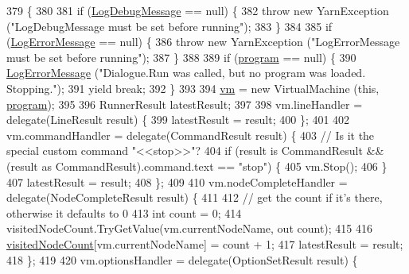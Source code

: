 \begin{DoxyCode}
379                                                                                              \{
380 
381             \textcolor{keywordflow}{if} (\hyperlink{a00082_a381f48bb0fbb294f8cf44ca57f11be31}{LogDebugMessage} == null) \{
382                 \textcolor{keywordflow}{throw} \textcolor{keyword}{new} YarnException (\textcolor{stringliteral}{"LogDebugMessage must be set before running"});
383             \}
384 
385             \textcolor{keywordflow}{if} (\hyperlink{a00082_a9801e83dd044d6498fdf6ebcc6bec5ac}{LogErrorMessage} == null) \{
386                 \textcolor{keywordflow}{throw} \textcolor{keyword}{new} YarnException (\textcolor{stringliteral}{"LogErrorMessage must be set before running"});
387             \}
388 
389             \textcolor{keywordflow}{if} (\hyperlink{a00082_a0a1cca92325f430425d784d416cb5c2b}{program} == null) \{
390                 \hyperlink{a00082_a9801e83dd044d6498fdf6ebcc6bec5ac}{LogErrorMessage} (\textcolor{stringliteral}{"Dialogue.Run was called, but no program was loaded.
       Stopping."});
391                 yield \textcolor{keywordflow}{break};
392             \}
393 
394             \hyperlink{a00082_a8c1319357a9df6cff051328fb33224c7}{vm} = \textcolor{keyword}{new} VirtualMachine (\textcolor{keyword}{this}, \hyperlink{a00082_a0a1cca92325f430425d784d416cb5c2b}{program});
395 
396             RunnerResult latestResult;
397 
398             vm.lineHandler = delegate(LineResult result) \{
399                 latestResult = result;
400             \};
401 
402             vm.commandHandler = delegate(CommandResult result) \{
403                 \textcolor{comment}{// Is it the special custom command "<<stop>>"?}
404                 \textcolor{keywordflow}{if} (result is CommandResult && (result as CommandResult).command.text == \textcolor{stringliteral}{"stop"}) \{
405                     vm.Stop();
406                 \}
407                 latestResult = result;
408             \};
409 
410             vm.nodeCompleteHandler = delegate(NodeCompleteResult result) \{
411 
412                 \textcolor{comment}{// get the count if it's there, otherwise it defaults to 0}
413                 \textcolor{keywordtype}{int} count = 0;
414                 visitedNodeCount.TryGetValue(vm.currentNodeName, out count);
415 
416                 \hyperlink{a00082_aae9e64354066a1e2fa130629959d772b}{visitedNodeCount}[vm.currentNodeName] = count + 1;
417                 latestResult = result;
418             \};
419 
420             vm.optionsHandler = delegate(OptionSetResult result) \{

\end{DoxyCode}
